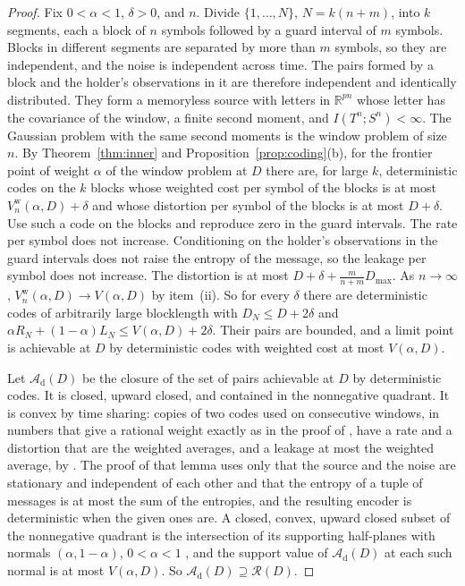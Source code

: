 \documentclass[11pt,onecolumn]{IEEEtran}
\newcommand{\R}{\mathbb{R}}
\begin{document}
\begin{proof}
Fix $0<\alpha<1$, $\delta>0$, and $n$. Divide $\{1,\dots,N\}$,
$N=k(n+m)$, into $k$ segments, each a block of $n$ symbols followed by
a guard interval of $m$ symbols. Blocks in different segments are
separated by more than $m$ symbols, so they are independent, and the
noise is independent across time. The pairs formed by a block and the
holder's observations in it are therefore independent and identically
distributed. They form a memoryless source with letters in $\R^{pn}$
whose letter has the covariance of the window, a finite second
moment, and $I(T^n;S^n)<\infty$. The Gaussian problem with the same
second moments is the window problem of size $n$. By
Theorem~\ref{thm:inner} and Proposition~\ref{prop:coding}(b), for the
frontier point of weight $\alpha$ of the window problem at $D$ there
are, for large $k$, deterministic codes on the $k$ blocks whose
weighted cost per symbol of the blocks is at most
$V^{\mathrm w}_n(\alpha,D)+\delta$ and whose distortion per symbol of the
blocks is at most $D+\delta$. Use such a code on the blocks and
reproduce zero in the guard intervals. The rate per symbol does not
increase. Conditioning on the holder's observations in the guard
intervals does not raise the entropy of the message, so the leakage
per symbol does not increase. The distortion is at most
$D+\delta+\tfrac m{n+m}D_{\max}$. As $n\to\infty$,
$V^{\mathrm w}_n(\alpha,D)\to V(\alpha,D)$ by item~(ii). So for every
$\delta$ there are deterministic codes of arbitrarily large blocklength
with $D_N\le D+2\delta$ and
$\alpha R_N+(1-\alpha)L_N\le V(\alpha,D)+2\delta$. Their pairs are
bounded, and a limit point is achievable at $D$ by deterministic codes
with weighted cost at most $V(\alpha,D)$.

Let $\mathcal A_{\mathrm d}(D)$ be the closure of the set of pairs
achievable at $D$ by deterministic codes. It is closed, upward closed,
and contained in the nonnegative quadrant. It is convex by time
sharing: copies of two codes used on consecutive windows, in numbers
that give a rational weight exactly as in the proof of
\cite[Theorem~16]{part2}, have a rate and a distortion that are the
weighted averages, and a leakage at most the weighted average, by
\cite[Lemma~18]{part2}. The proof of that lemma uses only that the
source and the noise are stationary and independent of each other and
that the entropy of a tuple of messages is at most the sum of the
entropies, and the resulting encoder is deterministic when the given
ones are. A closed, convex, upward closed subset of the nonnegative
quadrant is the intersection of its supporting half-planes with
normals $(\alpha,1-\alpha)$, $0<\alpha<1$ \cite[proof of
Theorem~16]{part2}, and the support value of
$\mathcal A_{\mathrm d}(D)$ at each such normal is at most
$V(\alpha,D)$. So $\mathcal A_{\mathrm d}(D)\supseteq\mathcal R(D)$.
\end{proof}
\end{document}
